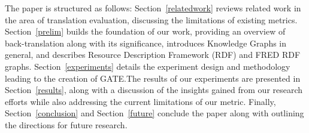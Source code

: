 \documentclass[runningheads]{llncs}
\begin{document}
The paper is structured as follows: Section~\ref{relatedwork} reviews related work in the area of translation evaluation, discussing the limitations of existing metrics. Section~\ref{prelim} builds the foundation of our work, providing an overview of back-translation along with its significance, introduces Knowledge Graphs in general, and describes Resource Description Framework (RDF) and FRED RDF graphs. Section~\ref{experiments} details the experiment design and methodology leading to the creation of GATE.\@ The results of our experiments are presented in Section~\ref{results}, along with a discussion of the insights gained from our research efforts while also addressing the current limitations of our metric. Finally, Section~\ref{conclusion} and Section~\ref{future} conclude the paper along with outlining the directions for future research. 


\end{document}
